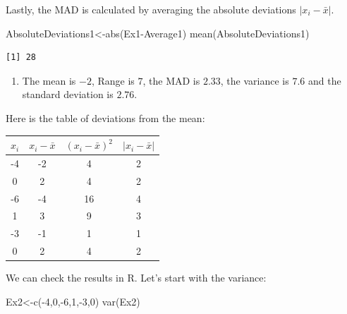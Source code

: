 \documentclass[
  letterpaper,
  DIV=11,
  numbers=noendperiod]{scrreprt}
\newenvironment{Shaded}{\begin{snugshade}}{\end{snugshade}}
\newcommand{\DecValTok}[1]{\textcolor[rgb]{0.68,0.00,0.00}{#1}}
\newcommand{\FunctionTok}[1]{\textcolor[rgb]{0.28,0.35,0.67}{#1}}
\newcommand{\NormalTok}[1]{\textcolor[rgb]{0.00,0.23,0.31}{#1}}
\newcommand{\OtherTok}[1]{\textcolor[rgb]{0.00,0.23,0.31}{#1}}
\newcommand{\SpecialCharTok}[1]{\textcolor[rgb]{0.37,0.37,0.37}{#1}}
\providecommand{\tightlist}{%
  \setlength{\itemsep}{0pt}\setlength{\parskip}{0pt}}\usepackage{longtable,booktabs,array}
\begin{document}
Lastly, the MAD is calculated by averaging the absolute deviations
\(|x_{i}-\bar{x}|\).

\begin{Shaded}
\begin{Highlighting}[numbers=left,,]
\NormalTok{AbsoluteDeviations1}\OtherTok{\textless{}{-}}\FunctionTok{abs}\NormalTok{(Ex1}\SpecialCharTok{{-}}\NormalTok{Average1)}
\FunctionTok{mean}\NormalTok{(AbsoluteDeviations1)}
\end{Highlighting}
\end{Shaded}

\begin{verbatim}
[1] 28
\end{verbatim}

\begin{blackbox}

\begin{enumerate}
\def\labelenumi{\arabic{enumi}.}
\setcounter{enumi}{1}
\tightlist
\item
  The mean is \(-2\), Range is \(7\), the MAD is \(2.33\), the variance
  is \(7.6\) and the standard deviation is \(2.76\).
\end{enumerate}

\end{blackbox}

Here is the table of deviations from the mean:

\begin{longtable}[]{@{}cccc@{}}
\toprule()
\(x_{i}\) & \(x_{i}-\bar{x}\) & \((x_{i}-\bar{x})^2\) &
\(|x_{i}-\bar{x}|\) \\
\midrule()
\endhead
-4 & -2 & 4 & 2 \\
0 & 2 & 4 & 2 \\
-6 & -4 & 16 & 4 \\
1 & 3 & 9 & 3 \\
-3 & -1 & 1 & 1 \\
0 & 2 & 4 & 2 \\
\bottomrule()
\end{longtable}

We can check the results in R. Let's start with the variance:

\begin{Shaded}
\begin{Highlighting}[numbers=left,,]
\NormalTok{Ex2}\OtherTok{\textless{}{-}}\FunctionTok{c}\NormalTok{(}\SpecialCharTok{{-}}\DecValTok{4}\NormalTok{,}\DecValTok{0}\NormalTok{,}\SpecialCharTok{{-}}\DecValTok{6}\NormalTok{,}\DecValTok{1}\NormalTok{,}\SpecialCharTok{{-}}\DecValTok{3}\NormalTok{,}\DecValTok{0}\NormalTok{)}
\FunctionTok{var}\NormalTok{(Ex2)}
\end{Highlighting}
\end{Shaded}
\end{document}
